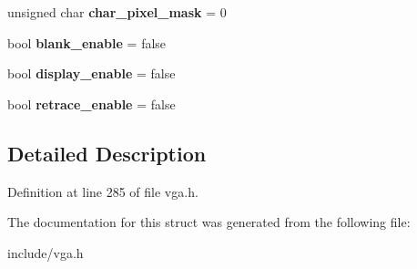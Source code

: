\begin{DoxyCompactItemize}
\item 
\hypertarget{structVGA__Experimental__Model__1__t_1_1general__dim_a0c824807f716c45aad2f1667ae16073f}{unsigned char {\bfseries char\-\_\-pixel\-\_\-mask} = 0}\label{structVGA__Experimental__Model__1__t_1_1general__dim_a0c824807f716c45aad2f1667ae16073f}

\item 
\hypertarget{structVGA__Experimental__Model__1__t_1_1general__dim_a48e20c031f69e25645e27b73ff3b29d0}{bool {\bfseries blank\-\_\-enable} = false}\label{structVGA__Experimental__Model__1__t_1_1general__dim_a48e20c031f69e25645e27b73ff3b29d0}

\item 
\hypertarget{structVGA__Experimental__Model__1__t_1_1general__dim_af81528832f693d7bcd3f3a8e0d43fb77}{bool {\bfseries display\-\_\-enable} = false}\label{structVGA__Experimental__Model__1__t_1_1general__dim_af81528832f693d7bcd3f3a8e0d43fb77}

\item 
\hypertarget{structVGA__Experimental__Model__1__t_1_1general__dim_a4ffa10fa85142585e3785ebe90a434c2}{bool {\bfseries retrace\-\_\-enable} = false}\label{structVGA__Experimental__Model__1__t_1_1general__dim_a4ffa10fa85142585e3785ebe90a434c2}

\end{DoxyCompactItemize}


\subsection{Detailed Description}


Definition at line 285 of file vga.\-h.



The documentation for this struct was generated from the following file\-:\begin{DoxyCompactItemize}
\item 
include/vga.\-h\end{DoxyCompactItemize}
